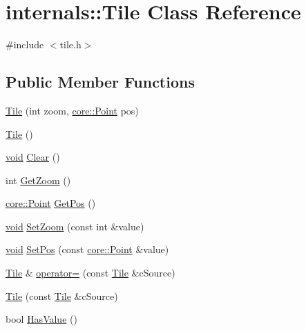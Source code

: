 \hypertarget{classinternals_1_1_tile}{\section{internals\-:\-:\-Tile \-Class \-Reference}
\label{classinternals_1_1_tile}
}


{\ttfamily \#include $<$tile.\-h$>$}

\subsection*{\-Public \-Member \-Functions}
\begin{DoxyCompactItemize}
\item 
\hyperlink{group___o_p_map_widget_ga60a32de8eb056679d219587b8caf1237}{\-Tile} (int zoom, \hyperlink{structcore_1_1_point}{core\-::\-Point} pos)
\item 
\hyperlink{group___o_p_map_widget_ga0dbddb1e894ab49cd9965e12002f3969}{\-Tile} ()
\item 
\hyperlink{group___u_a_v_objects_plugin_ga444cf2ff3f0ecbe028adce838d373f5c}{void} \hyperlink{group___o_p_map_widget_ga827a2b95ce33f4a2dcbb98cd1b94ea65}{\-Clear} ()
\item 
int \hyperlink{group___o_p_map_widget_ga8f3669a9492cdfacd22026ef7456735d}{\-Get\-Zoom} ()
\item 
\hyperlink{structcore_1_1_point}{core\-::\-Point} \hyperlink{group___o_p_map_widget_gacdfd78f26efd7d893ba5329145465096}{\-Get\-Pos} ()
\item 
\hyperlink{group___u_a_v_objects_plugin_ga444cf2ff3f0ecbe028adce838d373f5c}{void} \hyperlink{group___o_p_map_widget_gada2e44d9a3bcfa1e07e8220944335692}{\-Set\-Zoom} (const int \&value)
\item 
\hyperlink{group___u_a_v_objects_plugin_ga444cf2ff3f0ecbe028adce838d373f5c}{void} \hyperlink{group___o_p_map_widget_gabc58fab03485a97b6d6dbb4982ebf677}{\-Set\-Pos} (const \hyperlink{structcore_1_1_point}{core\-::\-Point} \&value)
\item 
\hyperlink{classinternals_1_1_tile}{\-Tile} \& \hyperlink{group___o_p_map_widget_ga00b02eca9e95aed841be1192fbd16e74}{operator=} (const \hyperlink{classinternals_1_1_tile}{\-Tile} \&c\-Source)
\item 
\hyperlink{group___o_p_map_widget_ga18b470118154d71c8f34a805c8bcc782}{\-Tile} (const \hyperlink{classinternals_1_1_tile}{\-Tile} \&c\-Source)
\item 
bool \hyperlink{group___o_p_map_widget_ga1224388bdb3b16ffe20514aa23ef0687}{\-Has\-Value} ()
\end{DoxyCompactItemize}
